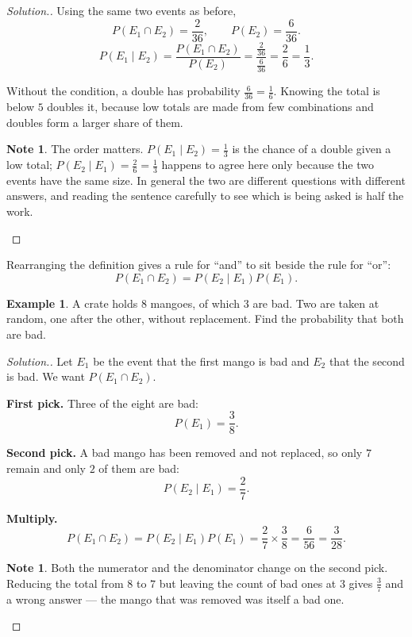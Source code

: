 \documentclass[11pt,a4paper]{article}
\theoremstyle{definition}
\newtheorem{example}[thm]{Example}
\newtheorem{note}[thm]{Note}
\newenvironment{solution}
  {\renewcommand{\qedsymbol}{}\begin{proof}[\textit{Solution}.]}
  {\end{proof}}
\begin{document}
\begin{solution}
Using the same two events as before,
$$P\left(E_1\cap E_2\right)=\frac{2}{36},\qquad P\left(E_2\right)=\frac{6}{36}.$$
$$P\left(E_1\mid E_2\right)=\frac{P\left(E_1\cap E_2\right)}{P\left(E_2\right)}
=\frac{\frac{2}{36}}{\frac{6}{36}}=\frac{2}{6}=\frac{1}{3}.$$

Without the condition, a double has probability $\frac{6}{36}=\frac{1}{6}$. Knowing the
total is below $5$ doubles it, because low totals are made from few combinations and
doubles form a larger share of them.

\begin{note}
The order matters. $P\left(E_1\mid E_2\right)=\frac{1}{3}$ is the chance of a double
given a low total; $P\left(E_2\mid E_1\right)=\frac{2}{6}=\frac{1}{3}$ happens to agree
here only because the two events have the same size. In general the two are different
questions with different answers, and reading the sentence carefully to see which is
being asked is half the work.
\end{note}
\end{solution}

Rearranging the definition gives a rule for ``and'' to sit beside the rule for ``or'':
$$P\left(E_1\cap E_2\right)=P\left(E_2\mid E_1\right)P\left(E_1\right).$$

\begin{example}
A crate holds $8$ mangoes, of which $3$ are bad. Two are taken at random, one after the
other, without replacement. Find the probability that both are bad.
\end{example}

\begin{solution}
Let $E_1$ be the event that the first mango is bad and $E_2$ that the second is bad. We
want $P\left(E_1\cap E_2\right)$.

\textbf{First pick.} Three of the eight are bad:
$$P\left(E_1\right)=\frac{3}{8}.$$

\textbf{Second pick.} A bad mango has been removed and not replaced, so only $7$ remain
and only $2$ of them are bad:
$$P\left(E_2\mid E_1\right)=\frac{2}{7}.$$

\textbf{Multiply.}
$$P\left(E_1\cap E_2\right)=P\left(E_2\mid E_1\right)P\left(E_1\right)
=\frac{2}{7}\times\frac{3}{8}=\frac{6}{56}=\frac{3}{28}.$$

\begin{note}
Both the numerator and the denominator change on the second pick. Reducing the total
from $8$ to $7$ but leaving the count of bad ones at $3$ gives $\frac{3}{7}$ and a wrong
answer --- the mango that was removed was itself a bad one.
\end{note}
\end{solution}
\end{document}
